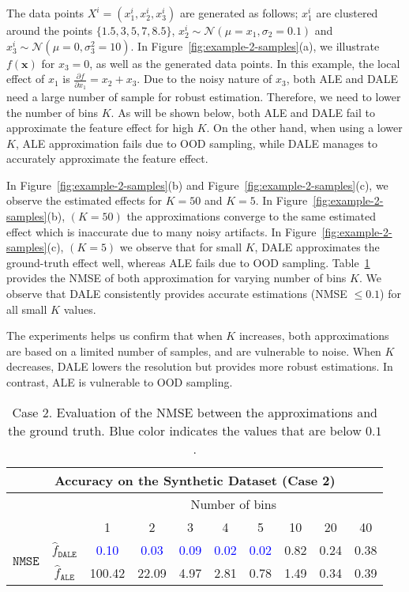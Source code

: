 \documentclass[wcp]{jmlr}
\newcommand{\dale}{\hat{f}_{\mathtt{DALE}}}
\newcommand{\alep}{\hat{f}_{\mathtt{ALE}}}
\newcommand{\xb}{\mathbf{x}} \newcommand{\R}{\mathbb{R}}
\begin{document}
\noindent
%
The data points \(X^i = (x_1^i, x_2^i, x_3^i)\) are generated as
follows; \(x_1^i \) are clustered around the points
\(\{1.5, 3, 5, 7, 8.5\}\),
\(x_2^i \sim \mathcal{N}(\mu=x_1, \sigma_2=0.1) \) and
\(x_3^i \sim \mathcal{N}(\mu=0, \sigma_3^2=10) \). In
Figure~\ref{fig:example-2-samples}(a), we illustrate \(f(\xb)\) for
\(x_3=0\), as well as the generated data points. In this example, the
local effect of \(x_1\) is
\(\frac{\partial f}{\partial x_1} = x_2 + x_3\). Due to the noisy
nature of \(x_3\), both ALE and DALE need a large number of sample for
robust estimation. Therefore, we need to lower the number of bins
\(K\). As will be shown below, both ALE and DALE fail to approximate
the feature effect for high \(K\). On the other hand, when using a
lower \(K\), ALE approximation fails due to OOD sampling, while DALE
manages to accurately approximate the feature effect.

In Figure~\ref{fig:example-2-samples}(b) and
Figure~\ref{fig:example-2-samples}(c), we observe the estimated
effects for \(K=50\) and \(K=5\). In
Figure~\ref{fig:example-2-samples}(b), \((K=50)\) the approximations
converge to the same estimated effect which is inaccurate due to many
noisy artifacts. In Figure~\ref{fig:example-2-samples}(c), \((K=5)\)
we observe that for small \(K\), DALE approximates the ground-truth
effect well, whereas ALE fails due to OOD
sampling. Table~\ref{tab:case-2-accuracy} provides the NMSE of both
approximation for varying number of bins \(K\). We observe that DALE
consistently provides accurate estimations (NMSE \(\leq 0.1\)) for all
small \(K\) values.

The experiments helps us confirm that when \(K \) increases, both
approximations are based on a limited number of samples, and are
vulnerable to noise. When \(K\) decreases, DALE lowers the resolution
but provides more robust estimations. In contrast, ALE is vulnerable
to OOD sampling.

\begin{table}
  \centering
  \caption{Case 2. Evaluation of the NMSE between the approximations and the ground truth. Blue color indicates the values that are below \(0.1\).}
  \label{tab:case-2-accuracy}
  \begin{tabular}{c|c|c|c|c|c|c|c|c|c}
    \multicolumn{10}{c}{Accuracy on the Synthetic Dataset (Case 2)} \\
    \hline \hline
    & & \multicolumn{8}{|c}{Number of bins} \\
    \hline
    & & 1 & 2 & 3 & 4 & 5 & 10 & 20 & 40 \\
    \hline
    \hline
    \multirow{2}{*}{\(\mathtt{NMSE}\)} & \(\dale\) & \textcolor{blue}{0.10} & \textcolor{blue}{0.03} & \textcolor{blue}{0.09} & \textcolor{blue}{0.02} & \textcolor{blue}{0.02} & 0.82 & 0.24 & 0.38\\
    & \(\alep\) & 100.42 & 22.09 & 4.97 & 2.81 & 0.78 & 1.49 & 0.34 & 0.39 \\
    \hline
  \end{tabular}
\end{table}
\end{document}
